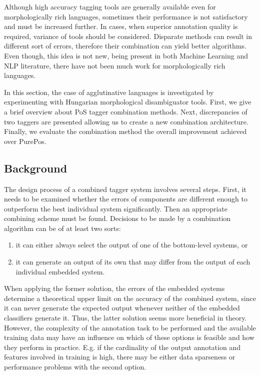 Although high accuracy tagging tools are generally available even for morphologically rich languages, sometimes their performance is not satisfactory and must be increased further.
In cases, when superior annotation quality is required, variance of tools should be considered.
Disparate methods can result in different sort of errors, therefore their combination can yield better algorithms.
Even though, this idea is not new, being present in both Machine Learning and NLP literature, there have not been much work for morphologically rich languages. 

In this section, the case of agglutinative languages is investigated by experimenting with Hungarian morphological disambiguator tools.
First, we give a brief overview about PoS tagger combination methods.
Next, discrepancies of two taggers are presented allowing us to create a new combination architecture.
Finally, we evaluate the combination method the overall improvement achieved over PurePos.

\subsection{Background}

The design process of a combined tagger system involves several steps. %
First, it needs to be examined whether the errors of components are different enough to outperform the best individual system significantly.
Then an appropriate combining scheme must be found.
Decisions to be made by a combination algorithm can be of at least two sorts: 
\begin{enumerate}
  \item it can either always select the output of one of the bottom-level systems, or 
  \item it can generate an output of its own that may differ from the output of each individual embedded system. 
\end{enumerate}

When applying the former solution, the errors of the embedded systems determine a theoretical upper limit on the accuracy of the combined system, since it can never generate the expected output whenever neither of the embedded classifiers generate it.
Thus, the latter solution seems more beneficial in theory.
However, the complexity of the annotation task to be performed and the available training data may have an influence on which of these options is feasible and how they perform in practice.
E.g. if the cardinality of the output annotation and features involved in training is high, there may be either data sparseness or performance problems with the second option.

